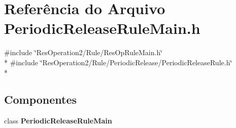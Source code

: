 \section{Referência do Arquivo Periodic\+Release\+Rule\+Main.\+h}
\label{_2_rule_2_periodic_release_2_periodic_release_rule_main_8h}
{\ttfamily \#include \char`\"{}Res\+Operation2/\+Rule/\+Res\+Op\+Rule\+Main.\+h\char`\"{}}\\*
{\ttfamily \#include \char`\"{}Res\+Operation2/\+Rule/\+Periodic\+Release/\+Periodic\+Release\+Rule.\+h\char`\"{}}\\*
\subsection*{Componentes}
\begin{DoxyCompactItemize}
\item 
class {\bf Periodic\+Release\+Rule\+Main}
\end{DoxyCompactItemize}
